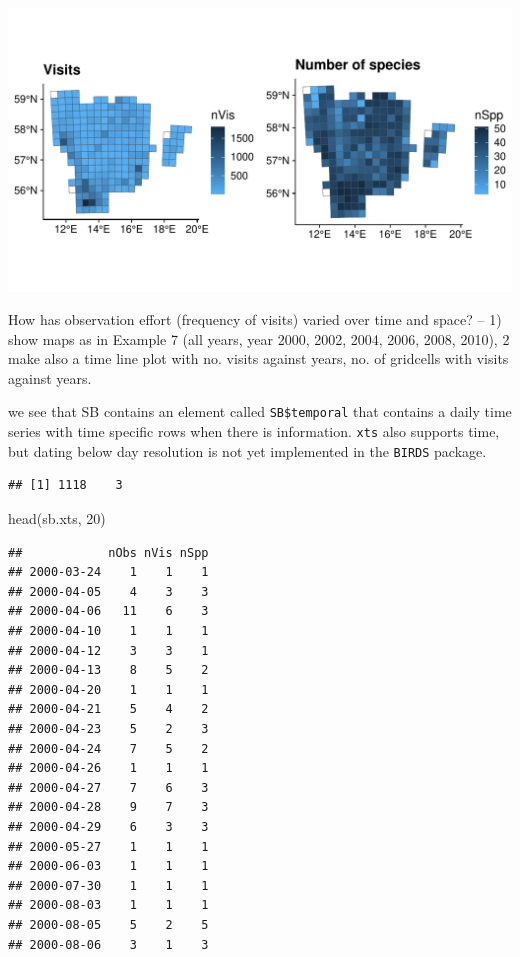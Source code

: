 \documentclass[
  10pt,
]{article}
\newenvironment{Shaded}{\begin{snugshade}}{\end{snugshade}}
\newcommand{\DecValTok}[1]{\textcolor[rgb]{0.00,0.00,0.81}{#1}}
\newcommand{\FunctionTok}[1]{\textcolor[rgb]{0.00,0.00,0.00}{#1}}
\newcommand{\NormalTok}[1]{#1}
\newcommand{\OtherTok}[1]{\textcolor[rgb]{0.56,0.35,0.01}{#1}}
\newcommand{\SpecialCharTok}[1]{\textcolor[rgb]{0.00,0.00,0.00}{#1}}
\begin{document}
\includegraphics{r-tools-tutorial_files/figure-latex/ggplot1-1.pdf}

How has observation effort (frequency of visits) varied over time and space? --
1) show maps as in Example 7 (all years, year 2000, 2002, 2004, 2006, 2008, 2010),
2 make also a time line plot with no. visits against years, no. of gridcells with visits against years.

we see that SB contains an element called \texttt{SB\$temporal} that contains a daily time series with time specific rows when there is information. \texttt{xts} also supports time, but dating below day resolution is not yet implemented in the \texttt{BIRDS} package.

\begin{Shaded}
\end{Shaded}

\begin{verbatim}
## [1] 1118    3
\end{verbatim}

\begin{Shaded}
\begin{Highlighting}[]
\FunctionTok{head}\NormalTok{(sb.xts, }\DecValTok{20}\NormalTok{)}
\end{Highlighting}
\end{Shaded}

\begin{verbatim}
##            nObs nVis nSpp
## 2000-03-24    1    1    1
## 2000-04-05    4    3    3
## 2000-04-06   11    6    3
## 2000-04-10    1    1    1
## 2000-04-12    3    3    1
## 2000-04-13    8    5    2
## 2000-04-20    1    1    1
## 2000-04-21    5    4    2
## 2000-04-23    5    2    3
## 2000-04-24    7    5    2
## 2000-04-26    1    1    1
## 2000-04-27    7    6    3
## 2000-04-28    9    7    3
## 2000-04-29    6    3    3
## 2000-05-27    1    1    1
## 2000-06-03    1    1    1
## 2000-07-30    1    1    1
## 2000-08-03    1    1    1
## 2000-08-05    5    2    5
## 2000-08-06    3    1    3
\end{verbatim}
\end{document}
